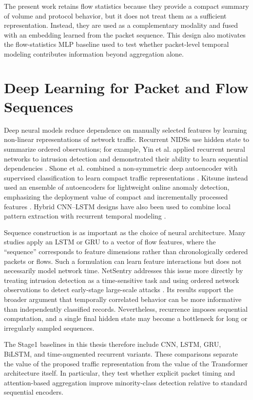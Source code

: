 \documentclass[11pt,fleqn]{report}
\begin{document}
The present work retains flow statistics because they provide a compact summary of volume and protocol behavior, but it does not treat them as a sufficient representation. Instead, they are used as a complementary modality and fused with an embedding learned from the packet sequence. This design also motivates the flow-statistics MLP baseline used to test whether packet-level temporal modeling contributes information beyond aggregation alone.

\section{Deep Learning for Packet and Flow Sequences}
\label{subsec:rw_deep_sequences}

Deep neural models reduce dependence on manually selected features by learning non-linear representations of network traffic. Recurrent NIDSs use hidden state to summarize ordered observations; for example, Yin et al. applied recurrent neural networks to intrusion detection and demonstrated their ability to learn sequential dependencies \cite{Yin2017RNNIDS}. Shone et al. combined a non-symmetric deep autoencoder with supervised classification to learn compact traffic representations \cite{Shone2018NNAE}. Kitsune instead used an ensemble of autoencoders for lightweight online anomaly detection, emphasizing the deployment value of compact and incrementally processed features \cite{Mirsky2018Kitsune}. Hybrid CNN--LSTM designs have also been used to combine local pattern extraction with recurrent temporal modeling \cite{Ullah2024IDSINT}.

Sequence construction is as important as the choice of neural architecture. Many studies apply an LSTM or GRU to a vector of flow features, where the ``sequence'' corresponds to feature dimensions rather than chronologically ordered packets or flows. Such a formulation can learn feature interactions but does not necessarily model network time. NetSentry addresses this issue more
directly by treating intrusion detection as a time-sensitive task and using ordered network observations to detect early-stage large-scale attacks \cite{LiuPatras2022NetSentry}. Its results support the broader argument that temporally correlated behavior can be more informative than independently classified records. Nevertheless, recurrence imposes sequential computation, and a single final hidden state may become a bottleneck for long or irregularly sampled sequences.

The Stage1 baselines in this thesis therefore include CNN, LSTM, GRU, BiLSTM, and time-augmented recurrent variants. These comparisons separate the value of the proposed traffic representation from the value of the Transformer architecture itself. In particular, they test whether explicit packet timing and attention-based aggregation improve minority-class detection relative to standard sequential encoders.
\end{document}
